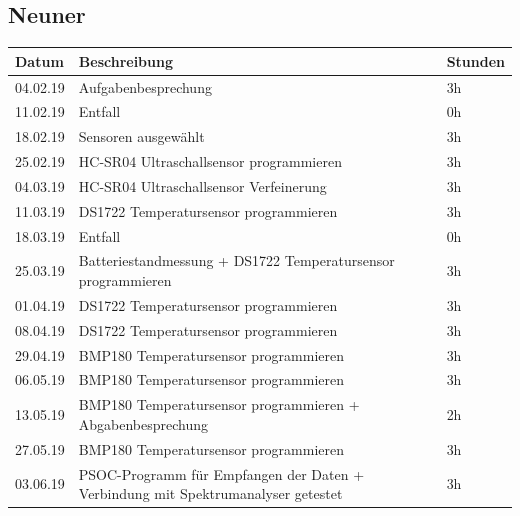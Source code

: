 \documentclass[12pt,a4paper,german]{article}
\begin{document}
\subsection{Neuner}

\begin{table}[H]
\centering 
\begin{tabularx}{\textwidth}{|l|X|l|}
\hline
\textbf{Datum} & \textbf{Beschreibung} & \textbf{Stunden} \\ 
\hline
\hline
04.02.19 & Aufgabenbesprechung & 3h \\ 
\hline
11.02.19 & Entfall & 0h \\ 
\hline
18.02.19 & Sensoren ausgewählt & 3h \\ 
\hline
25.02.19 & HC-SR04 Ultraschallsensor programmieren & 3h \\ 
\hline
04.03.19 & HC-SR04 Ultraschallsensor Verfeinerung & 3h \\ 
\hline
11.03.19 & DS1722 Temperatursensor programmieren & 3h \\ 
\hline
18.03.19 & Entfall & 0h\\ 
\hline
25.03.19 & Batteriestandmessung + DS1722 Temperatursensor programmieren & 3h \\ 
\hline
01.04.19 & DS1722 Temperatursensor programmieren& 3h \\ 
\hline
08.04.19 & DS1722 Temperatursensor programmieren & 3h \\ 
\hline
29.04.19 & BMP180 Temperatursensor programmieren & 3h \\ 
\hline
06.05.19 & BMP180 Temperatursensor programmieren & 3h \\ 
\hline
13.05.19 & BMP180 Temperatursensor programmieren + Abgabenbesprechung & 2h \\ 
\hline
27.05.19 & BMP180 Temperatursensor programmieren & 3h \\ 
\hline
03.06.19 & PSOC-Programm für Empfangen der Daten + Verbindung mit Spektrumanalyser getestet & 3h \\ 
\hline
\end{tabularx}
\end{table}
\end{document}
